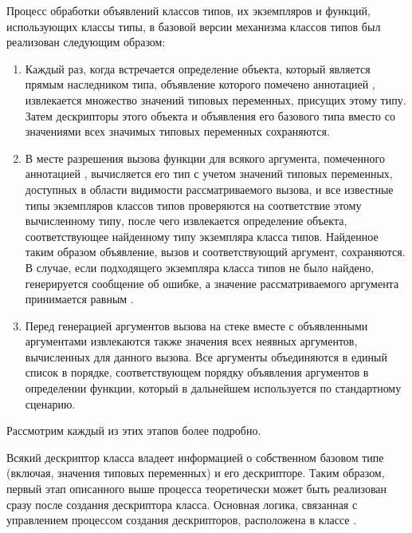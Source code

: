 Процесс обработки объявлений классов типов, их экземпляров и функций, использующих классы типы, в базовой версии механизма классов типов был реализован следующим образом:  
\begin{enumerate}
    \item Каждый раз, когда встречается определение объекта, который является  прямым наследником типа, объявление которого помечено аннотацией , извлекается множество значений типовых переменных, присущих этому типу. Затем дескрипторы этого объекта и объявления его базового типа вместо со значениями всех значимых типовых переменных сохраняются. 
    \item В месте разрешения вызова функции для всякого аргумента, помеченного аннотацией , вычисляется его тип с учетом значений типовых переменных, доступных в области видимости рассматриваемого вызова, и все известные типы экземпляров классов типов проверяются на соответствие этому вычисленному типу, после чего извлекается определение объекта, соответствующее найденному типу экземпляра класса типов. Найденное таким образом объявление, вызов и соответствующий аргумент, сохраняются. В случае, если подходящего экземпляра класса типов не было найдено, генерируется сообщение об ошибке, а значение рассматриваемого аргумента принимается равным . 
    \item Перед генерацией аргументов вызова на стеке вместе с объявленными аргументами извлекаются также значения всех неявных аргументов, вычисленных для данного вызова. Все аргументы объединяются в единый список в порядке, соответствующем порядку объявления аргументов в определении функции, который в дальнейшем используется по стандартному сценарию.    
\end{enumerate}   
Рассмотрим каждый из этих этапов более подробно.

Всякий дескриптор класса владеет информацией о собственном базовом типе (включая, значения типовых переменных) и его дескрипторе. Таким образом, первый этап описанного выше процесса теоретически может быть реализован сразу после создания дескриптора класса. Основная логика, связанная с управлением процессом создания дескрипторов, расположена в классе . 

